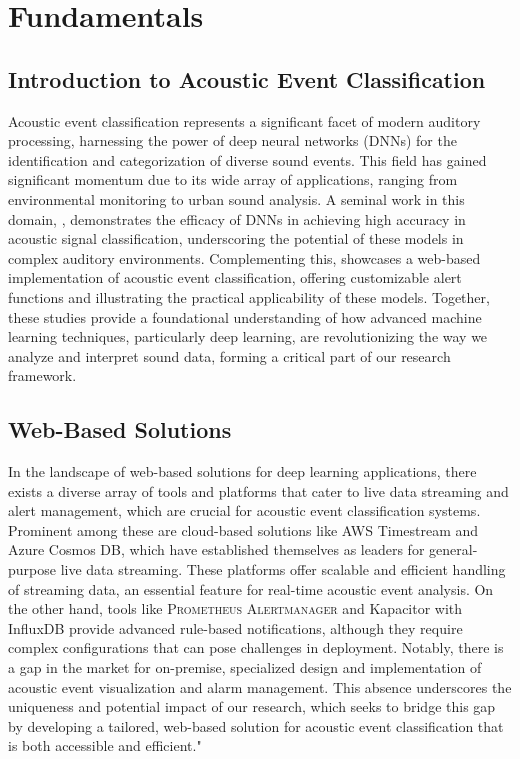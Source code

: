 \chapter{Fundamentals}
\section{Introduction to Acoustic Event Classification}

Acoustic event classification represents a significant facet of modern auditory processing, harnessing the power of deep neural networks (DNNs) for the identification and categorization of diverse sound events. This field has gained significant momentum due to its wide array of applications, ranging from environmental monitoring to urban sound analysis. A seminal work in this domain, \cite{sampath2020low}, demonstrates the efficacy of DNNs in achieving high accuracy in acoustic signal classification, underscoring the potential of these models in complex auditory environments. Complementing this, \cite{sampath2019realtime} showcases a web-based implementation of acoustic event classification, offering customizable alert functions and illustrating the practical applicability of these models. Together, these studies provide a foundational understanding of how advanced machine learning techniques, particularly deep learning, are revolutionizing the way we analyze and interpret sound data, forming a critical part of our research framework.

\section{Web-Based Solutions}

In the landscape of web-based solutions for deep learning applications, there exists a diverse array of tools and platforms that cater to live data streaming and alert management, which are crucial for acoustic event classification systems. Prominent among these are cloud-based solutions like AWS Timestream\cite{AWSTimestream} and Azure Cosmos DB\cite{AzureCosmos}, which have established themselves as leaders for general-purpose live data streaming. These platforms offer scalable and efficient handling of streaming data, an essential feature for real-time acoustic event analysis. On the other hand, tools like \textsc{Prometheus} \textsc{Alertmanager}\cite{AlertManager} and Kapacitor with InfluxDB\cite{kapacitor} provide advanced rule-based notifications, although they require complex configurations that can pose challenges in deployment. Notably, there is a gap in the market for on-premise, specialized design and implementation of acoustic event visualization and alarm management. This absence underscores the uniqueness and potential impact of our research, which seeks to bridge this gap by developing a tailored, web-based solution for acoustic event classification that is both accessible and efficient."

